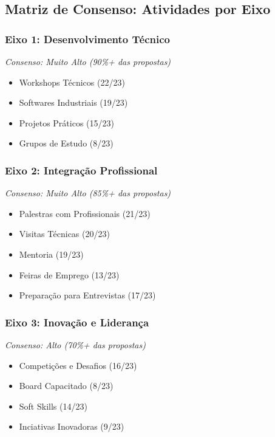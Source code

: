 \documentclass[12pt,a4paper]{article}
\begin{document}
\newpage

\subsection{Matriz de Consenso: Atividades por Eixo}

\subsubsection*{Eixo 1: Desenvolvimento Técnico}
\textit{Consenso: Muito Alto (90\%+ das propostas)}
\begin{itemize}[itemsep=0.15cm]
    \item[\checkmark] Workshops Técnicos (22/23)
    \item[\checkmark] Softwares Industriais (19/23)
    \item[\checkmark] Projetos Práticos (15/23)
    \item[\checkmark] Grupos de Estudo (8/23)
\end{itemize}

\subsubsection*{Eixo 2: Integração Profissional}
\textit{Consenso: Muito Alto (85\%+ das propostas)}
\begin{itemize}[itemsep=0.15cm]
    \item[\checkmark] Palestras com Profissionais (21/23)
    \item[\checkmark] Visitas Técnicas (20/23)
    \item[\checkmark] Mentoria (19/23)
    \item[\checkmark] Feiras de Emprego (13/23)
    \item[\checkmark] Preparação para Entrevistas (17/23)
\end{itemize}

\subsubsection*{Eixo 3: Inovação e Liderança}
\textit{Consenso: Alto (70\%+ das propostas)}
\begin{itemize}[itemsep=0.15cm]
    \item[\checkmark] Competições e Desafios (16/23)
    \item[\checkmark] Board Capacitado (8/23)
    \item[\checkmark] Soft Skills (14/23)
    \item[\checkmark] Inciativas Inovadoras (9/23)
\end{itemize}
\end{document}
